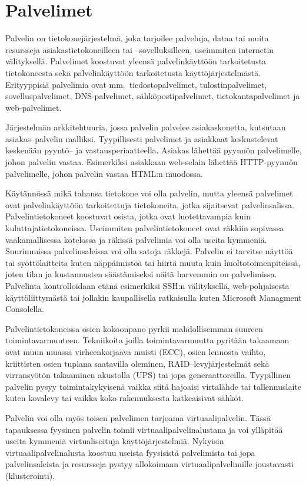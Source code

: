 \section{Palvelimet}\label{palvelimet}

Palvelin on tietokonejärjestelmä, joka tarjoilee palveluja, dataa tai muita resursseja asiakastietokoneilleen tai –sovelluksilleen, useimmiten internetin välityksellä. Palvelimet koostuvat yleensä palvelinkäyttöön tarkoitetusta tietokoneesta sekä palvelinkäyttöön tarkoitetusta käyttöjärjestelmästä. Erityyppisiä palvelimia ovat mm.\ tiedostopalvelimet, tulostinpalvelimet, sovelluspalvelimet, DNS-palvelimet, sähköpostipalvelimet, tietokantapalvelimet ja web-palvelimet.

Järjestelmän arkkitehtuuria, jossa palvelin palvelee asiakaskonetta, kutsutaan asiakas–palvelin malliksi. Tyypillisesti palvelimet ja asiakkaat keskustelevat keskenään pyyntö– ja vastausperiaatteella. Asiakas lähettää pyynnön palvelimelle, johon palvelin vastaa. Esimerkiksi asiakkaan web-selain lähettää HTTP-pyynnön palvelimelle, johon palvelin vastaa HTML:n muodossa.

Käytännössä mikä tahansa tietokone voi olla palvelin, mutta yleensä palvelimet ovat palvelinkäyttöön tarkoitettuja tietokoneita, jotka sijaitsevat palvelinsalissa. Palvelintietokoneet koostuvat osista, jotka ovat luotettavampia kuin kuluttajatietokoneissa. Useimmiten palvelintietokoneet ovat räkkiin sopivassa vaakamallisessa kotelossa ja räkissä palvelimia voi olla useita kymmeniä. Suurimmissa palvelinsaleissa voi olla satoja räkkejä. Palvelin ei tarvitse näyttöä tai syöttölaitteita kuten näppäimistöä tai hiirtä muuta kuin huoltotoimenpiteissä, joten tilan ja kustannusten säästämiseksi näitä harvemmin on palvelimissa. Palvelinta kontrolloidaan etänä esimerkiksi SSH:n välityksellä, web-pohjaisesta käyttöliittymästä tai jollakin kaupallisella ratkaisulla kuten Microsoft Managment Consolella.

Palvelintietokoneissa osien kokoonpano pyrkii mahdollisemman suureen toimintavarmuuteen. Tekniikoita joilla toimintavarmuutta pyritään takaamaan ovat muun muassa virheenkorjaava muisti (ECC), osien lennosta vaihto, kriittisten osien tuplana saatavilla oleminen, RAID–levyjärjestelmät sekä virransyötön takaaminen akustolla (UPS) tai jopa generaattoreilla. Tyypillinen palvelin pysyy toimintakykyisenä vaikka siitä hajoaisi virtalähde tai tallennuslaite kuten kovalevy tai vaikka koko rakennuksesta katkeaisivat sähköt.~\cite{paessler}

Palvelin voi olla myös toisen palvelimen tarjoama virtuaalipalvelin. Tässä tapauksessa fyysinen palvelin toimii virtuaalipalvelinalustana ja voi ylläpitää useita kymmeniä virtualisoituja käyttöjärjestelmiä. Nykyisin virtuaalipalvelinalusta koostuu useista fyysisistä palvelimista tai jopa palvelinsaleista ja resursseja pystyy allokoimaan virtuaalipalvelimille joustavasti (klusterointi).

